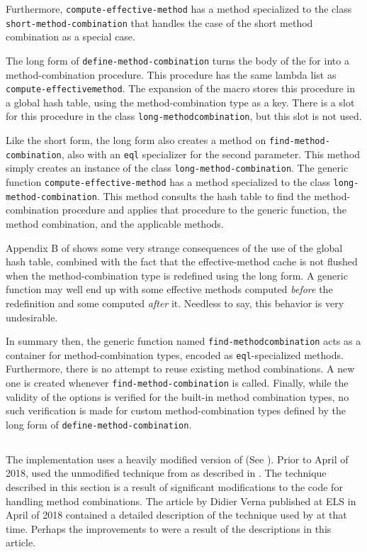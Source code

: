 Furthermore, \texttt{compute-effective-method} has a method
specialized to the class \texttt{short-method-combination} that
handles the case of the short method combination as a special case.

The long form of \texttt{define-method-combination} turns the body of
the for into a method-combination procedure.  This procedure has the
same lambda list as \texttt{compute-effective\-method}.  The expansion
of the macro stores this procedure in a global hash table, using the
method-combination type as a key.  There is a slot for this procedure
in the class \texttt{long-method\-combination}, but this slot is not
used.

Like the short form, the long form also creates a method on
\texttt{find-method-combination}, also with an \texttt{eql}
specializer for the second parameter. This method simply creates an
instance of the class \texttt{long-method-combination}.  The generic
function \texttt{compute-effective-method} has a method specialized to
the class \texttt{long-method-combination}.  This method consults the
hash table to find the method-combination procedure and applies that
procedure to the generic function, the method combination, and the
applicable methods.

Appendix B of \cite{verna.18.els} shows some very strange consequences
of the use of the global hash table, combined with the fact that the
effective-method cache is not flushed when the method-combination type
is redefined using the long form.  A generic function may well end up
with some effective methods computed \emph{before} the redefinition
and some  computed \emph{after} it.  Needless to say, this behavior is
very undesirable.

In summary then, the generic function named \texttt{find-method\-combination}
acts as a container for method-combination types, encoded as
\texttt{eql}-specialized methods.  Furthermore, there is no attempt to
reuse existing method combinations.  A new one is created whenever
\texttt{find-method-combination} is called.  Finally, while the
validity of the options is verified for the built-in method
combination types, no such verification is made for custom
method-combination types defined by the long form of
\texttt{define-method-combination}.

\subsection{\sbcl{}}

The \sbcl{} \commonlisp{} implementation uses a heavily modified
version of \pcl{} (See ).  Prior to April of 2018,
\sbcl{} used the unmodified technique from \pcl{} as described in
.  The technique described in this section is a result
of significant modifications to the code for handling method
combinations.  The article by Didier Verna \cite{verna.18.els}
published at ELS in April of 2018 contained a detailed description of
the technique used by \sbcl{} at that time.  Perhaps the improvements
to \sbcl{} were a result of the descriptions in this article.

